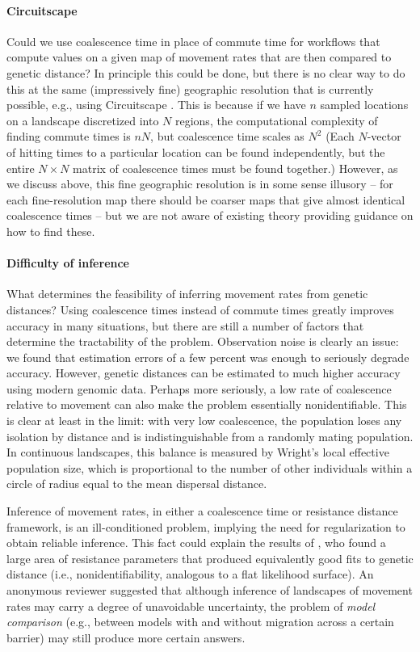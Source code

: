 \documentclass{article}
\begin{document}
\paragraph{Circuitscape}
Could we use coalescence time in place of commute time
for workflows that compute values on a given map of movement rates
that are then compared to genetic distance?
In principle this could be done,
but there is no clear way to do this 
at the same (impressively fine) geographic resolution that is currently possible,
e.g., using Circuitscape \citep{mcrae2006isolation}.
This is because if we have $n$ sampled locations
on a landscape discretized into $N$ regions,
the computational complexity of finding commute times is $nN$,
but coalescence time scales as $N^2$
(Each $N$-vector of hitting times to a particular location can be found independently,
but the entire $N \times N$ matrix of coalescence times must be found together.)
However, as we discuss above, this fine geographic resolution is in some sense illusory --
for each fine-resolution map there should be coarser maps that give almost identical coalescence times --
but we are not aware of existing theory providing guidance on how to find these.

\paragraph{Difficulty of inference}
What determines the feasibility of inferring movement rates from genetic distances?
Using coalescence times instead of commute times greatly improves accuracy in many situations,
but there are still a number of factors that determine the tractability of the problem.
Observation noise is clearly an issue:
we found that estimation errors of a few percent was enough to seriously degrade accuracy.
However, genetic distances can be estimated to much higher accuracy using modern genomic data.
Perhaps more seriously,
a low rate of coalescence relative to movement can also make the problem essentially nonidentifiable.
This is clear at least in the limit: with very low coalescence, 
the population loses any isolation by distance and is indistinguishable from a randomly mating population.
In continuous landscapes, this balance is measured by Wright's local effective population size,
which is proportional to the number of other individuals 
within a circle of radius equal to the mean dispersal distance.

Inference of movement rates, in either a coalescence time or resistance distance framework,
is an ill-conditioned problem,
implying the need for regularization to obtain reliable inference.
This fact could explain the results of \citet{graves2013current},
who found a large area of resistance parameters
that produced equivalently good fits to genetic distance
(i.e., nonidentifiability, analogous to a flat likelihood surface).
An anonymous reviewer suggested
that although inference of landscapes of movement rates may carry a degree of unavoidable uncertainty,
the problem of \emph{model comparison} 
(e.g., between models with and without migration across a certain barrier)
may still produce more certain answers. 
\end{document}
